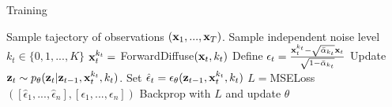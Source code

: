 \begin{algorithm}[H]
\footnotesize
\caption{\algo{} Training}
\label{alg:diffusion_forcing_training}
\begin{algorithmic}[1]
\LOOP
    \STATE Sample tajectory of observations $(\mathbf{x}_1, ..., \mathbf{x}_T)$.
        \STATE Sample independent noise level $k_t \in \{0,1, ... ,K\}$
        \STATE $\mathbf{x}_t^{k_t}=\ $ForwardDiffuse$(\mathbf{x}_t, k_t)$
        \STATE Define $\epsilon_t = \frac{\mathbf{x}_t^{k_t}-\sqrt{\bar{\alpha}_{k_t}} \mathbf{x}_t}{\sqrt{1-\bar{\alpha}_{k_t}}}$ 
         \STATE Update $\mathbf{z}_t \sim p_\theta(\mathbf{z}_t|\mathbf{z}_{t-1}, \mathbf{x}_t^{k_t}, k_t)$.
        \STATE Set $\hat{\epsilon}_t = \epsilon_\theta(\mathbf{z}_{t-1},\mathbf{x}_t^{k_t},k_t)$
    \ENDFOR
    \STATE $L=$MSELoss$(\left[\hat{\epsilon}_1, ..., \hat{\epsilon}_n\right], \left[\epsilon_1, ..., \epsilon_n\right])$ 
    \STATE Backprop with $L$ and update $\theta$
\ENDLOOP
\end{algorithmic}
\end{algorithm}
